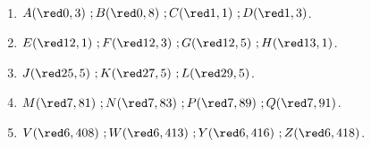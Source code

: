  \begin{corrige}
   \ \\ [-5mm]
   \begin{enumerate}
      \item $A({\red 0,3})   ~; \hfill B({\red 0,8})   ~; \hfill C({\red 1,1})  ~; \hfill D({\red 1,3})$.
      \item $E({\red 12,1})  ~; \hfill F({\red 12,3})  ~; \hfill G({\red 12,5}) ~; \hfill H({\red 13,1})$.
      \item $J({\red 25,5})  ~; \hfill K({\red 27,5})  ~; \hfill L({\red 29,5})$.
      \item $M({\red 7,81})  ~; \hfill N({\red 7,83})  ~; \hfill P({\red 7,89})  ~; \hfill Q({\red 7,91})$.
      \item $V({\red 6,408}) ~; \hfill W({\red 6,413}) ~; \hfill Y({\red 6,416}) ~; \hfill Z({\red 6,418})$.
   \end{enumerate}
 \end{corrige}
